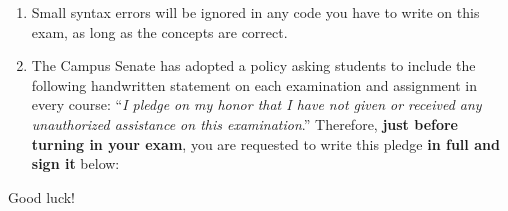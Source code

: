 \documentclass[11pt]{article}
\begin{document}
\begin{enumerate}
    \item Small syntax errors will be ignored in any code you have to write
          on this exam, as long as the concepts are correct.

    \item The Campus Senate has adopted a policy asking students to include
          the following handwritten statement on each examination and
          assignment in every course: ``\textit{I pledge on my honor that I
          have not given or received any unauthorized assistance on this
          examination\/}.''  Therefore, \textbf{just before turning in your
          exam}, you are requested to write this pledge \textbf{in full
          \textmd{and} sign it} below:

          \medskip

          \begin{minipage}[t]{6.6in}

            \addtolength{\baselineskip}{4mm}

            \underline{\hspace{6.6in}}

            \underline{\hspace{6.6in}}

          \end{minipage}

    \medskip

  \end{enumerate}

  \vspace{-1.5mm}

  \noindent
  Good luck!


  \pagebreak


  \pagestyle{headings}

\end{document}

